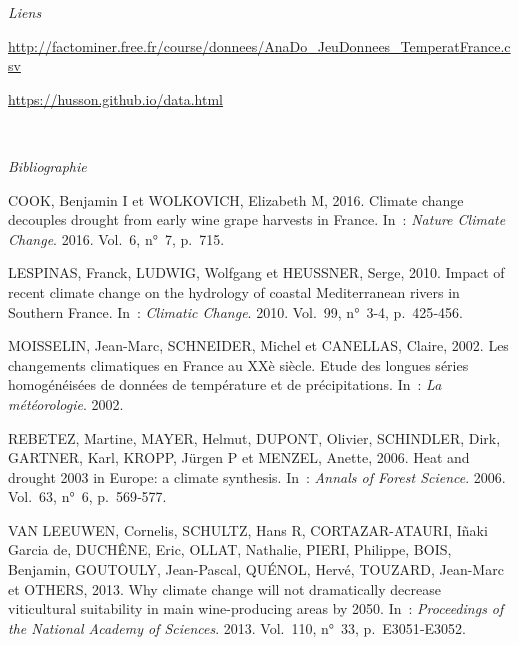 \documentclass[
]{article}
\begin{document}
\emph{Liens}

\url{http://factominer.free.fr/course/donnees/AnaDo_JeuDonnees_TemperatFrance.csv}

\url{https://husson.github.io/data.html}

~

\emph{Bibliographie}

\hypertarget{refs}{}
\leavevmode\hypertarget{ref-cook2016climate}{}%
COOK, Benjamin I et WOLKOVICH, Elizabeth M, 2016. Climate change
decouples drought from early wine grape harvests in France. In~:
\emph{Nature Climate Change}. 2016. Vol.~6, n°~7, p.~715.

\leavevmode\hypertarget{ref-lespinas2010impact}{}%
LESPINAS, Franck, LUDWIG, Wolfgang et HEUSSNER, Serge, 2010. Impact of
recent climate change on the hydrology of coastal Mediterranean rivers
in Southern France. In~: \emph{Climatic Change}. 2010. Vol.~99, n°~3-4,
p.~425‑456.

\leavevmode\hypertarget{ref-moisselin2002changements}{}%
MOISSELIN, Jean-Marc, SCHNEIDER, Michel et CANELLAS, Claire, 2002. Les
changements climatiques en France au XXè siècle. Etude des longues
séries homogénéisées de données de température et de précipitations.
In~: \emph{La météorologie}. 2002.

\leavevmode\hypertarget{ref-rebetez2006heat}{}%
REBETEZ, Martine, MAYER, Helmut, DUPONT, Olivier, SCHINDLER, Dirk,
GARTNER, Karl, KROPP, Jürgen P et MENZEL, Anette, 2006. Heat and drought
2003 in Europe: a climate synthesis. In~: \emph{Annals of Forest
Science}. 2006. Vol.~63, n°~6, p.~569‑577.

\leavevmode\hypertarget{ref-van2013climate}{}%
VAN LEEUWEN, Cornelis, SCHULTZ, Hans R, CORTAZAR-ATAURI, Iñaki Garcia
de, DUCHÊNE, Eric, OLLAT, Nathalie, PIERI, Philippe, BOIS, Benjamin,
GOUTOULY, Jean-Pascal, QUÉNOL, Hervé, TOUZARD, Jean-Marc et OTHERS,
2013. Why climate change will not dramatically decrease viticultural
suitability in main wine-producing areas by 2050. In~: \emph{Proceedings
of the National Academy of Sciences}. 2013. Vol.~110, n°~33,
p.~E3051‑E3052.
\end{document}
